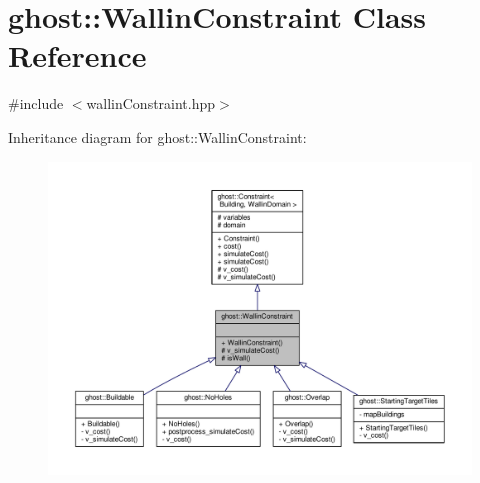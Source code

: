 \hypertarget{classghost_1_1WallinConstraint}{\section{ghost\-:\-:Wallin\-Constraint Class Reference}
\label{classghost_1_1WallinConstraint}
}


{\ttfamily \#include $<$wallin\-Constraint.\-hpp$>$}



Inheritance diagram for ghost\-:\-:Wallin\-Constraint\-:
\nopagebreak
\begin{figure}[H]
\begin{center}
\leavevmode
\includegraphics[width=350pt]{classghost_1_1WallinConstraint__inherit__graph}
\end{center}
\end{figure}


